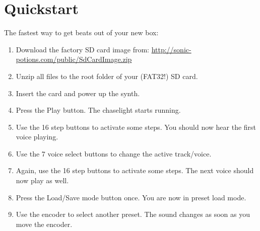 \section{Quickstart}\label{quickstart}

The fastest way to get beats out of your new box:

\begin{enumerate}
\def\labelenumi{\arabic{enumi}.}
\tightlist
\item
  Download the factory SD card image from:
  \url{http://sonic-potions.com/public/SdCardImage.zip}
\item
  Unzip all files to the root folder of your (FAT32!) SD card.
\item
  Insert the card and power up the synth.
\item
  Press the Play button. The chaselight starts running.
\item
  Use the 16 step buttons to activate some steps. You should now hear
  the first voice playing.
\item
  Use the 7 voice select buttons to change the active track/voice.
\item
  Again, use the 16 step buttons to activate some steps. The next voice
  should now play as well.
\item
  Press the Load/Save mode button once. You are now in preset load mode.
\item
  Use the encoder to select another preset. The sound changes as soon as
  you move the encoder.
\end{enumerate}
